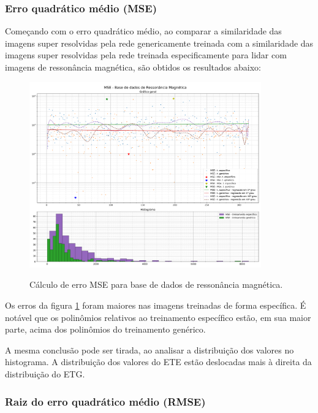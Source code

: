 \subsubsection{Erro quadrático médio (MSE)}
\label{sec:result:mri:mse}

Começando com o erro quadrático médio, ao comparar a similaridade das imagens super resolvidas pela rede genericamente treinada com a similaridade das imagens super resolvidas pela rede treinada especificamente para lidar com imagens de ressonância magnética, são obtidos os resultados abaixo:

\begin{figure}[H]
    \centering
    \caption{Cálculo de erro MSE para base de dados de ressonância magnética.}
    \includegraphics[width=10cm]{fig/resultados/mri/png/mse_mri_compound.png}
    \label{fig:results:fig1}
\end{figure}

Os erros da figura \ref{fig:results:fig1} foram maiores nas imagens treinadas de forma específica. É notável que os polinômios relativos ao treinamento específico estão, em sua maior parte, acima dos polinômios do treinamento genérico. 

A mesma conclusão pode ser tirada, ao analisar a distribuição dos valores no histograma. A distribuição dos valores do ETE estão deslocadas mais à direita da distribuição do ETG. 


\subsubsection{Raiz do erro quadrático médio (RMSE)}
\label{sec:result:mri:rmse}


